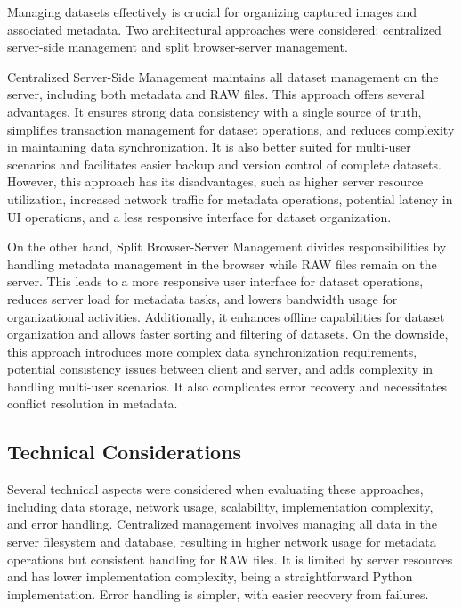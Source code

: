 Managing datasets effectively is crucial for organizing captured images and associated metadata. Two architectural approaches were considered: centralized server-side management and split browser-server management.

Centralized Server-Side Management maintains all dataset management on the server, including both metadata and RAW files. This approach offers several advantages. It ensures strong data consistency with a single source of truth, simplifies transaction management for dataset operations, and reduces complexity in maintaining data synchronization. It is also better suited for multi-user scenarios and facilitates easier backup and version control of complete datasets. However, this approach has its disadvantages, such as higher server resource utilization, increased network traffic for metadata operations, potential latency in UI operations, and a less responsive interface for dataset organization.

On the other hand, Split Browser-Server Management divides responsibilities by handling metadata management in the browser while RAW files remain on the server. This leads to a more responsive user interface for dataset operations, reduces server load for metadata tasks, and lowers bandwidth usage for organizational activities. Additionally, it enhances offline capabilities for dataset organization and allows faster sorting and filtering of datasets. On the downside, this approach introduces more complex data synchronization requirements, potential consistency issues between client and server, and adds complexity in handling multi-user scenarios. It also complicates error recovery and necessitates conflict resolution in metadata.

\subsection{Technical Considerations}

Several technical aspects were considered when evaluating these approaches, including data storage, network usage, scalability, implementation complexity, and error handling. Centralized management involves managing all data in the server filesystem and database, resulting in higher network usage for metadata operations but consistent handling for RAW files. It is limited by server resources and has lower implementation complexity, being a straightforward Python implementation. Error handling is simpler, with easier recovery from failures.

